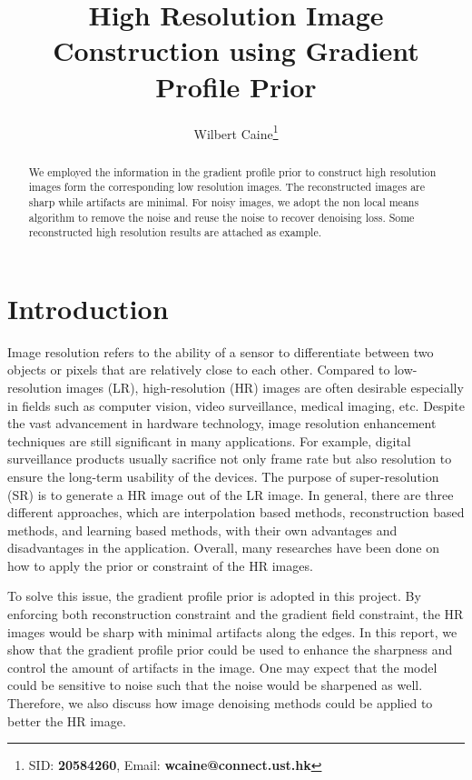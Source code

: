 \documentclass[a4paper,11pt]{article}
\title{High Resolution Image Construction using Gradient Profile Prior}
\author{
Wilbert Caine\thanks{SID: {\bf 20584260}, Email: {\bf wcaine@connect.ust.hk}}
}
\begin{document}
\thispagestyle{plain}
\maketitle


\begin{abstract}
We employed the information in the gradient profile prior to construct high resolution images form the corresponding low resolution images. The reconstructed images are sharp while artifacts are minimal. For noisy images, we adopt the non local means algorithm to remove the noise and reuse the noise to recover denoising loss. Some reconstructed high resolution results are attached as example.
\end{abstract}


\section{Introduction}

Image resolution refers to the ability of a sensor to differentiate between two objects or pixels that are relatively close to each other. Compared to low-resolution images (LR), high-resolution (HR) images are often desirable especially in fields such as computer vision, video surveillance, medical imaging, etc. Despite the vast advancement in hardware technology, image resolution enhancement techniques are still significant in many applications. For example, digital surveillance products usually sacrifice not only frame rate but also resolution to ensure the long-term usability of the devices\cite{in16}. The purpose of super-resolution (SR) is to generate a HR image out of the LR image. In general, there are three different approaches, which are interpolation based methods, reconstruction based methods, and learning based methods, with their own advantages and disadvantages in the application\cite{sr11}. Overall, many researches have been done on how to apply the prior or constraint of the HR images.

To solve this issue, the gradient profile prior\cite{sr11} is adopted in this project. By enforcing both reconstruction constraint and the gradient field constraint, the HR images would be sharp with minimal artifacts along the edges. In this report, we show that the gradient profile prior could be used to enhance the sharpness and control the amount of artifacts in the image. One may expect that the model could be sensitive to noise such that the noise would be sharpened as well. Therefore, we also discuss how image denoising methods could be applied to better the HR image.
\end{document}
